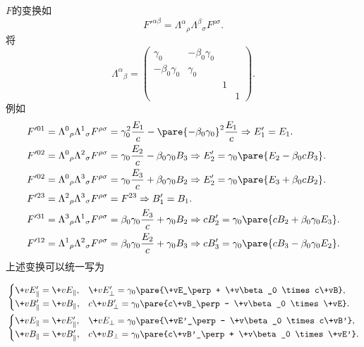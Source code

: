 \documentclass[hidelinks]{ctexart}
\begin{document}
$F$的变换如
\[ F'^{\alpha\beta} = {\Lambda^\alpha}_\rho {\Lambda^\beta}_\sigma F^{\rho\sigma}. \]
将
\[ {\Lambda^\alpha}_\beta = \begin{pmatrix}
    \gamma_0 & -\beta_0\gamma_0 & &  \\
    -\beta_0\gamma_0 & \gamma_0 & &  \\
    & & 1 & \\
    & & & 1
\end{pmatrix}. \]
例如
\begin{align*}
    F'^{01} &= {\Lambda^{0}}_\rho {\Lambda^1}_\sigma F^{\rho\sigma} = \gamma_0^2 \frac{E_1}{c} - \pare{-\beta_0\gamma_0}^2 \frac{E_1}{c} \Rightarrow E'_1 = E_1. \\
    F'^{02} &= {\Lambda^{0}}_\rho {\Lambda^2}_\sigma F^{\rho\sigma} = \gamma_0 \frac{E_2}{c} - \beta_0\gamma_0 B_3 \Rightarrow E'_2 = \gamma_0 \pare{E_2 - \beta_0 cB_3}. \\
    F'^{02} &= {\Lambda^{0}}_\rho {\Lambda^3}_\sigma F^{\rho\sigma} = \gamma_0 \frac{E_3}{c} + \beta_0\gamma_0 B_2 \Rightarrow E'_2 = \gamma_0 \pare{E_3 + \beta_0 cB_2}. \\
    F'^{23} &= {\Lambda^2}_\rho {\Lambda^3}_\sigma F^{\rho\sigma} = F^{23} \Rightarrow B'_1 = B_1. \\
    F'^{31} &= {\Lambda^3}_\rho {\Lambda^1}_\sigma F^{\rho\sigma} = \beta_0\gamma_0 \frac{E_3}{c} + \gamma_0 B_2 \Rightarrow cB'_2 = \gamma_0\pare{cB_2 + \beta_0\gamma_0 E_3}. \\
    F'^{12} &= {\Lambda^1}_\rho {\Lambda^2}_\sigma F^{\rho\sigma} = \beta_0\gamma_0 \frac{E_2}{c} + \gamma_0 B_3 \Rightarrow cB'_3 = \gamma_0\pare{cB_3 - \beta_0\gamma_0 E_2}.
\end{align*}
上述变换可以统一写为
\begin{resume}
    \vspace{-\baselineskip}
    \begin{align*}
    &    \begin{cases}
        \+vE'_\parallel = \+vE_\parallel, & \+vE'_\perp = \gamma_0 \pare{\+vE_\perp + \+v\beta_0 \times c\+vB}, \\
        \+vB'_\parallel = \+vB_\parallel, & c\+vB'_\perp = \gamma_0 \pare{c\+vB_\perp - \+v\beta_0 \times \+vE}.
    \end{cases} \\
    &   \begin{cases}
        \+vE_\parallel = \+vE'_\parallel, & \+vE_\perp = \gamma_0 \pare{\+vE'_\perp - \+v\beta_0 \times c\+vB'}, \\
        \+vB_\parallel = \+vB'_\parallel, & c\+vB_\perp = \gamma_0 \pare{c\+vB'_\perp + \+v\beta_0 \times \+vE'}.
    \end{cases}
    \end{align*}
\end{resume}
\end{document}
